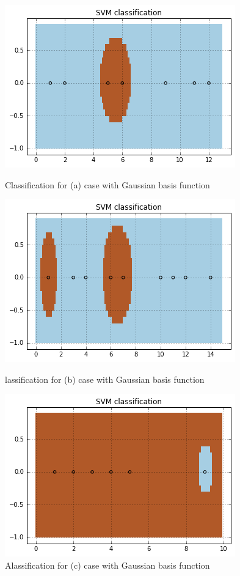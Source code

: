 \documentclass[a4paper, 12pt]{article}
\begin{document}
\begin{figure}[!htb]
  \includegraphics[width=\linewidth]{arbf}
  \caption{Classification for (a) case with Gaussian basis function}\label{fig:arbf}
\endminipage\hfill
{}
  \includegraphics[width=\linewidth]{brbf}
  \caption{lassification for (b) case with Gaussian basis function}\label{fig:brbf}
\endminipage\hfill
{}%
  \includegraphics[width=\linewidth]{crbf}
  \caption{Alassification for (c) case with Gaussian basis function}\label{fig:crbf}
\endminipage
\end{figure}
\end{document}
